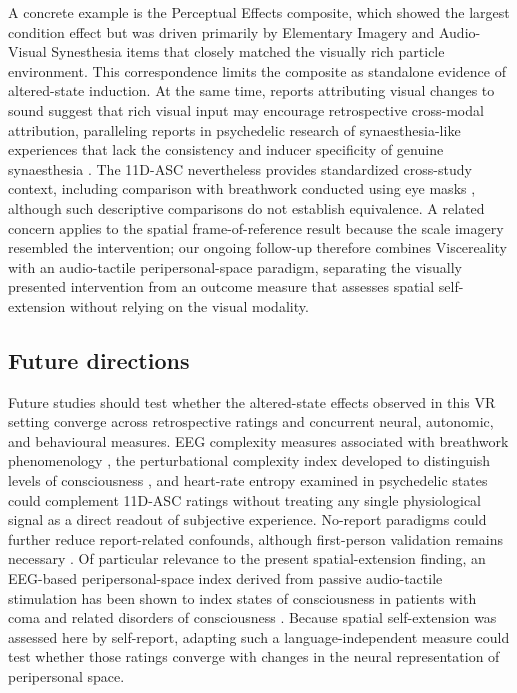 \documentclass[pdflatex,sn-basic,lineno]{sn-jnl}
\begin{document}
A concrete example is the Perceptual Effects composite, which showed the largest condition effect but was driven primarily by Elementary Imagery and Audio-Visual Synesthesia items that closely matched the visually rich particle environment. This correspondence limits the composite as standalone evidence of altered-state induction. At the same time, reports attributing visual changes to sound suggest that rich visual input may encourage retrospective cross-modal attribution, paralleling reports in psychedelic research of synaesthesia-like experiences that lack the consistency and inducer specificity of genuine synaesthesia \citep{Terhune2016LSD}. The 11D-ASC nevertheless provides standardized cross-study context, including comparison with breathwork conducted using eye masks \citep{fincham2026airways}, although such descriptive comparisons do not establish equivalence. A related concern applies to the spatial frame-of-reference result because the scale imagery resembled the intervention; our ongoing follow-up therefore combines Viscereality with an audio-tactile peripersonal-space paradigm, separating the visually presented intervention from an outcome measure that assesses spatial self-extension without relying on the visual modality.

\subsection{Future directions}
Future studies should test whether the altered-state effects observed in this VR setting converge across retrospective ratings and concurrent neural, autonomic, and behavioural measures. EEG complexity measures associated with breathwork phenomenology \citep{lewis2024breathwork}, the perturbational complexity index developed to distinguish levels of consciousness \citep{Casali2013}, and heart-rate entropy examined in psychedelic states \citep{rosas2023entropic} could complement 11D-ASC ratings without treating any single physiological signal as a direct readout of subjective experience. No-report paradigms could further reduce report-related confounds, although first-person validation remains necessary \citep{Tsuchiya2015,LaukkonenSlagter2021}. Of particular relevance to the present spatial-extension finding, an EEG-based peripersonal-space index derived from passive audio-tactile stimulation has been shown to index states of consciousness in patients with coma and related disorders of consciousness \citep{Bertoni2026PPS}. Because spatial self-extension was assessed here by self-report, adapting such a language-independent measure could test whether those ratings converge with changes in the neural representation of peripersonal space.
\end{document}
